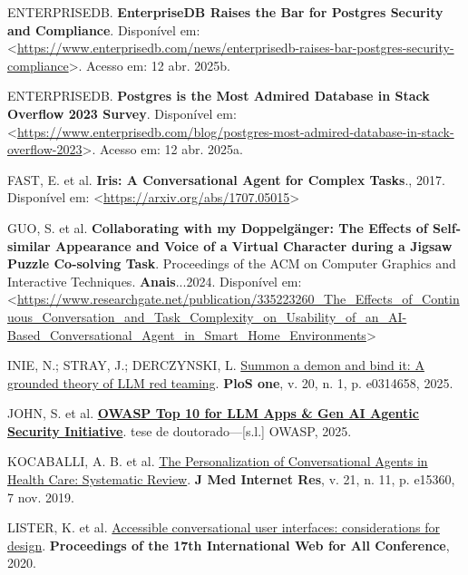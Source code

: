 \documentclass[
]{article}
\newlength{\cslhangindent}
\newenvironment{CSLReferences}[2] %
 {\begin{list}{}{%
  \setlength{\itemindent}{0pt}
  \setlength{\leftmargin}{0pt}
  \setlength{\parsep}{0pt}
  \ifodd #1
   \setlength{\leftmargin}{\cslhangindent}
   \setlength{\itemindent}{-1\cslhangindent}
  \fi
  \setlength{\itemsep}{#2\baselineskip}}}
 {\end{list}}
\begin{document}
\begin{CSLReferences}{0}{1}
ENTERPRISEDB. \textbf{EnterpriseDB Raises the Bar for Postgres Security
and Compliance}. Disponível em:
\textless{}\url{https://www.enterprisedb.com/news/enterprisedb-raises-bar-postgres-security-compliance}\textgreater.
Acesso em: 12 abr. 2025b.

ENTERPRISEDB. \textbf{Postgres is the Most Admired Database in Stack
Overflow 2023 Survey}. Disponível em:
\textless{}\url{https://www.enterprisedb.com/blog/postgres-most-admired-database-in-stack-overflow-2023}\textgreater.
Acesso em: 12 abr. 2025a.

FAST, E. et al. \textbf{Iris: A Conversational Agent for Complex
Tasks}., 2017. Disponível em:
\textless{}\url{https://arxiv.org/abs/1707.05015}\textgreater{}

GUO, S. et al. \textbf{Collaborating with my Doppelgänger: The Effects
of Self-similar Appearance and Voice of a Virtual Character during a
Jigsaw Puzzle Co-solving Task}. Proceedings of the ACM on Computer
Graphics and Interactive Techniques. \textbf{Anais}...2024. Disponível
em:
\textless{}\url{https://www.researchgate.net/publication/335223260_The_Effects_of_Continuous_Conversation_and_Task_Complexity_on_Usability_of_an_AI-Based_Conversational_Agent_in_Smart_Home_Environments}\textgreater{}

INIE, N.; STRAY, J.; DERCZYNSKI, L.
\href{https://journals.plos.org/plosone/article?id=10.1371/journal.pone.0314658}{Summon
a demon and bind it: A grounded theory of LLM red teaming}. \textbf{PloS
one}, v. 20, n. 1, p. e0314658, 2025.

JOHN, S. et al.
\textbf{\href{https://genai.owasp.org/llmrisk/llm01-prompt-injection}{OWASP
Top 10 for LLM Apps \& Gen AI Agentic Security Initiative}}. tese de
doutorado---{[}s.l.{]} OWASP, 2025.

KOCABALLI, A. B. et al. \href{https://doi.org/10.2196/15360}{The
Personalization of Conversational Agents in Health Care: Systematic
Review}. \textbf{J Med Internet Res}, v. 21, n. 11, p. e15360, 7 nov.
2019.

LISTER, K. et al.
\href{https://api.semanticscholar.org/CorpusID:218539971}{Accessible
conversational user interfaces: considerations for design}.
\textbf{Proceedings of the 17th International Web for All Conference},
2020.


\end{CSLReferences}
\end{document}
